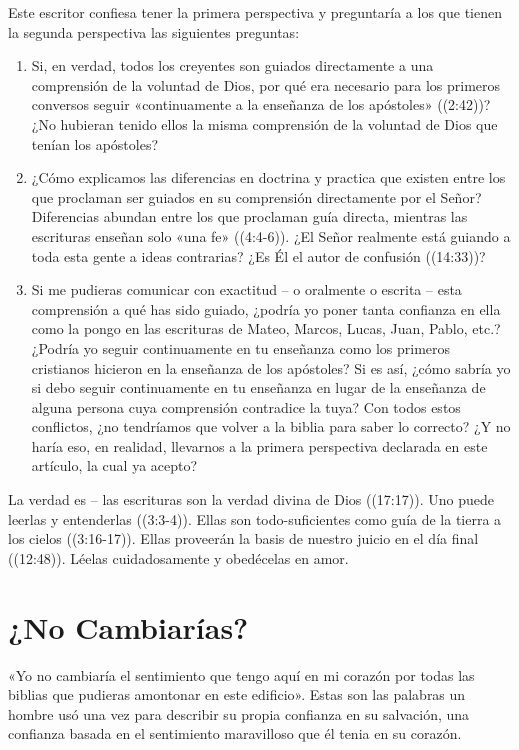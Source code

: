 \documentclass[12pt, twoside, openright]{book}
\begin{document}
Este escritor confiesa tener la primera perspectiva y preguntaría a los que tienen la segunda perspectiva las siguientes preguntas:
\begin{enumerate}
\item Si, en verdad, todos los creyentes son guiados directamente a una comprensión de la voluntad de Dios, por qué era necesario para los primeros conversos seguir «continuamente a la enseñanza de los apóstoles» ((2:42))? ¿No hubieran tenido ellos la misma comprensión de la voluntad de Dios que tenían los apóstoles? 
\item ¿Cómo explicamos las diferencias en doctrina y practica que existen entre los que proclaman ser guiados en su comprensión directamente por el Señor? Diferencias abundan entre los que proclaman guía directa, mientras las escrituras enseñan solo «una fe» ((4:4-6)). ¿El Señor realmente está guiando a toda esta gente a ideas contrarias? ¿Es Él el autor de confusión ((14:33))?
\item Si me pudieras comunicar con exactitud – o oralmente o escrita – esta comprensión a qué has sido guiado, ¿podría yo poner tanta confianza en ella como la pongo en las escrituras de Mateo, Marcos, Lucas, Juan, Pablo, etc.? ¿Podría yo seguir continuamente en tu enseñanza como los primeros cristianos hicieron en la enseñanza de los apóstoles? Si es así, ¿cómo sabría yo si debo seguir continuamente en tu enseñanza en lugar de la enseñanza de alguna persona cuya comprensión contradice la tuya? Con todos estos conflictos, ¿no tendríamos que volver a la biblia para saber lo correcto? ¿Y no haría eso, en realidad, llevarnos a la primera perspectiva declarada en este artículo, la cual ya acepto?
\end{enumerate}
La verdad es – las escrituras son la verdad divina de Dios ((17:17)). Uno puede leerlas y entenderlas ((3:3-4)). Ellas son todo-suficientes como guía de la tierra a los cielos ((3:16-17)). Ellas proveerán la basis de nuestro juicio en el día final ((12:48)). Léelas cuidadosamente y obedécelas en amor. 

\section{¿No Cambiarías?}
«Yo no cambiaría el sentimiento que tengo aquí en mi corazón por todas las biblias que pudieras amontonar en este edificio». Estas son las palabras un hombre usó una vez para describir su propia confianza en su salvación, una confianza basada en el sentimiento maravilloso que él tenia en su corazón. 
\end{document}

